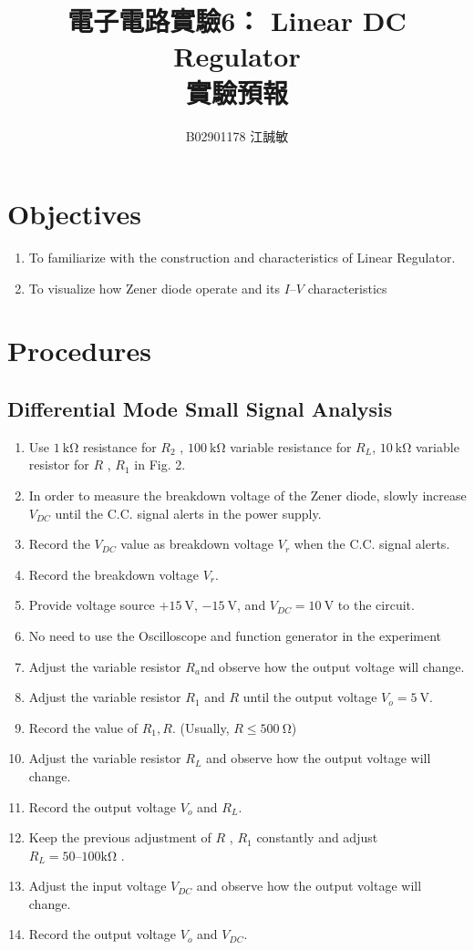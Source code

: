 \documentclass[12pt, a4paper]{article}
\title{ \bf {\huge 電子電路實驗6： Linear DC Regulator }\\ 實驗預報}
\author{B02901178 江誠敏}
\begin{document}
\maketitle

\section{Objectives}
\begin{enumerate}
  \item To familiarize with the construction and characteristics of Linear Regulator. 
  \item To visualize how Zener diode operate and its $I\text{--}V$ characteristics
\end{enumerate}


\section{Procedures}
\subsection{Differential Mode Small Signal Analysis}
\begin{enumerate}[itemsep=0pt]
\item Use $\SI{1}\kohm$ resistance for $R_2$ , $\SI{100}\kohm$ variable resistance for $R_L$,
  $\SI{10}\kohm$ variable resistor for $R$ , $R_1$ in Fig. 2. 
\item In order to measure the breakdown voltage of the Zener diode, slowly increase 
  $V_{DC}$ until the C.C. signal alerts in the power supply.   
\item Record the $V_{DC}$ value as breakdown voltage $V_r$ when the C.C. signal alerts. 
\item Record the breakdown voltage $V_r$.
\item Provide voltage source $+\SI{15}\V$, $\SI{-15}\V$, and $V_{DC}  = \SI{10}\V$ to the circuit. 
\item No need to use the Oscilloscope and function generator in the experiment 
\item Adjust the variable resistor $R_a$nd observe how the output voltage will change. 
\item Adjust the variable resistor $R_1$ and $R$ until the output voltage $V_o = \SI{5}{\V}$. 
\item Record the value of $R_1, R$. (Usually, $R \leq \SI{500}\ohm$) 
\item Adjust the variable resistor $R_L$ and observe how the output voltage will change.  
\item Record the output voltage $V_o$ and $R_L$.
\item Keep the previous adjustment of $R$ , $R_1$ constantly and adjust $R_L = 50 \text{--} 100 \si{\kohm}$ . 
\item Adjust the input voltage $V_{DC}$ and observe how the output voltage will change. 
\item Record the output voltage $V_o$ and $V_{DC}$.
\end{enumerate}
\end{document}
